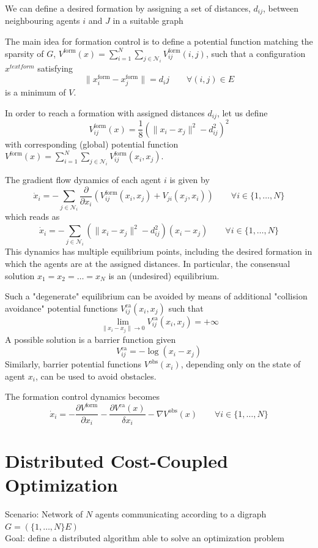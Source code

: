 \documentclass{book}
\theoremstyle{theoremv2}
\theoremstyle{defv2}
\theoremstyle{remark}
\theoremstyle{remark}
\theoremstyle{definition}
\theoremstyle{definition}
\begin{document}
 We can define a desired formation by assigning a set of distances, $d_{ij}$, between neighbouring agents $i$ and $J$ in a suitable graph 
 
 The main idea for formation control is to define a potential function matching the sparsity of $G$, $V^{\text{form}}(x) = \sum_{i=1}^{N}\sum_{j\in\mathcal{N}_i}V_{ij}^{\text{form}}(i,j)$, such that a configuration $x^{text{form}}$ satisfying 
 \[
     \|x_i^{\text{form}}-x_j^{\text{form}}\| = d_ij \qquad \forall (i,j)\in E
 \]
 is a minimum of $V$.

 In order to reach a formation with assigned distances $d_{ij}$, let us define 
 \[
     V_{ij}^{\text{form}}(x) = \displaystyle\frac{1}{8} \left(\|x_i-x_j\|^2-d_{ij}^2\right)^2
 \]
 with corresponding (global) potential function $V^{\text{form}}(x) = \displaystyle\sum_{i=1}^{N}\displaystyle\sum_{j\in\mathcal{N}_i}V_{ij}^\text{form}(x_i,x_j)$.

 The gradient flow dynamics of each agent $i$ is given by 
 \[
     \dot{x}_i = - \displaystyle\sum_{j\in\mathcal{N}_i}\displaystyle\frac{\partial}{\partial x_i} \left(V_{ij}^\text{form}(x_i,x_j)+V_{ji}(x_j,x_i)\right) \qquad \forall i \in \{1,\dots,N\}
 \]
 which reads as 
 \[
     \dot{x}_i = - \displaystyle\sum_{j\in\mathcal{N}_i} \left(\|x_i-x_j\|^2-d_{ij}^2\right)(x_i-x_j) \qquad \forall i \in \{1,\dots,N\}
 \]
This dynamics has multiple equilibrium points, including the desired formation in which the agents are at the assigned distances. In particular, the consensual solution $x_1=x_2=\dots=x_N$ is an (undesired) equilibrium.

Such a "degenerate" equilibrium can be avoided by means of additional "collision avoidance" potential functions $V_{ij}^\text{ca}(x_i,x_j)$ such that 
\[
    \lim_{\|x_i-x_j\|\to 0} V_{ij}^\text{ca}(x_i,x_j)=+\infty
\]
A possible solution is a barrier function given 
\[
    V_{ij}^\text{ca} = -\log(x_i-x_j)
\]
Similarly, barrier potential functions $V^\text{obs}(x_i)$, depending only on the state of agent $x_i$, can be used to avoid obstacles. 

The formation control dynamics becomes 
\[
    \dot{x}_i = - \displaystyle\frac{\partial V^\text{form}}{\partial x_i} - \displaystyle\frac{\partial V^\text{ca}(x)}{\delta x_i} - \nabla V^\text{obs}(x) \qquad \forall i\in\{1,\dots,N\}
\]

\chapter{Distributed Cost-Coupled Optimization}
Scenario: Network of $N$ agents communicating according to a digraph $G=(\{1,\dots,N\}E)$
\\Goal: define a distributed algorithm able to solve an optimization problem
\end{document}
